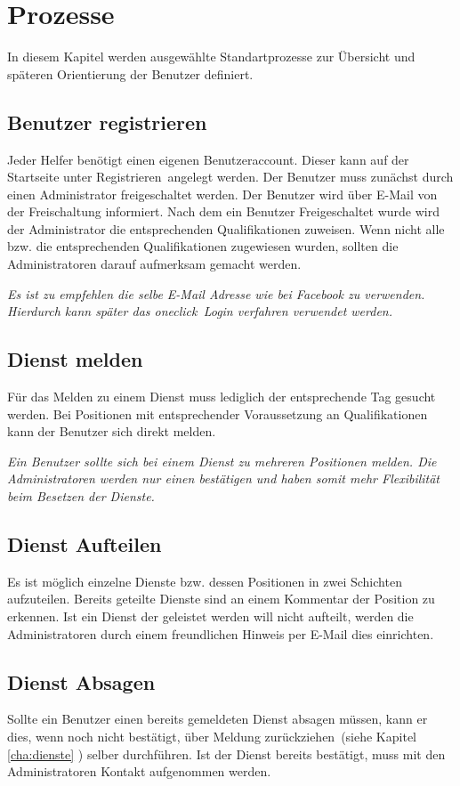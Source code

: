 \chapter{Prozesse}
\label{cha:prozesse}
In diesem Kapitel werden ausgewählte Standartprozesse zur Übersicht und späteren Orientierung der Benutzer definiert.

\section{Benutzer registrieren}
\label{sec:process_register}
Jeder Helfer benötigt einen eigenen Benutzeraccount. Dieser kann auf der Startseite unter \glqq Registrieren\grqq ~angelegt werden. Der Benutzer muss zunächst durch einen Administrator freigeschaltet werden. Der Benutzer wird über E-Mail von der Freischaltung informiert. Nach dem ein Benutzer Freigeschaltet wurde wird der Administrator die entsprechenden Qualifikationen zuweisen. Wenn nicht alle bzw. die entsprechenden Qualifikationen zugewiesen wurden, sollten die Administratoren darauf aufmerksam gemacht werden.

\noindent \textit{Es ist zu empfehlen die selbe E-Mail Adresse wie bei Facebook zu verwenden. Hierdurch kann später das \glqq oneclick\grqq ~Login verfahren verwendet werden.}

\section{Dienst melden}
\label{sec:process_position_apply}
Für das Melden zu einem Dienst muss lediglich der entsprechende Tag gesucht werden. Bei Positionen mit entsprechender Voraussetzung an Qualifikationen kann der Benutzer sich direkt melden.

\noindent \textit{Ein Benutzer sollte sich bei einem Dienst zu mehreren Positionen melden. Die Administratoren werden nur einen bestätigen und haben somit mehr Flexibilität beim Besetzen der Dienste.}

\section{Dienst Aufteilen}
\label{sec:process_service_split}
Es ist möglich einzelne Dienste bzw. dessen Positionen in zwei Schichten aufzuteilen. Bereits geteilte Dienste sind an einem Kommentar der Position zu erkennen. Ist ein Dienst der geleistet werden will nicht aufteilt, werden die Administratoren durch einem freundlichen Hinweis per E-Mail dies einrichten.

\section{Dienst Absagen}
\label{sec:process_service_cancel}
Sollte ein Benutzer einen bereits gemeldeten Dienst absagen müssen, kann er dies, wenn noch nicht bestätigt, über \glqq Meldung zurückziehen\grqq ~(siehe Kapitel \ref{cha:dienste} ) selber durchführen. Ist der Dienst bereits bestätigt, muss mit den Administratoren Kontakt aufgenommen werden.